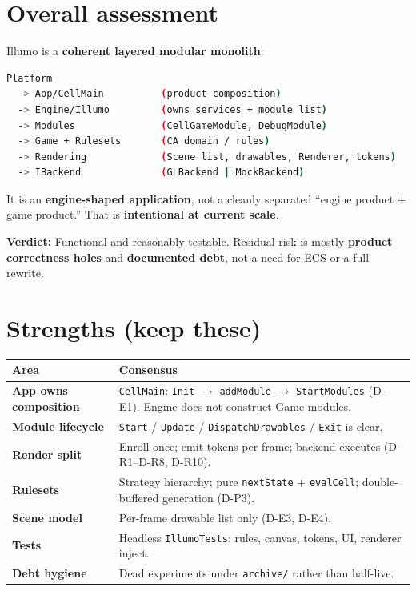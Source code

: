 \documentclass[10pt,a4paper]{article}
\begin{document}
\section{Overall assessment}
Illumo is a \textbf{coherent layered modular monolith}:

\begin{lstlisting}[language=bash]
Platform
  -> App/CellMain          (product composition)
  -> Engine/Illumo         (owns services + module list)
  -> Modules               (CellGameModule, DebugModule)
  -> Game + Rulesets       (CA domain / rules)
  -> Rendering             (Scene list, drawables, Renderer, tokens)
  -> IBackend              (GLBackend | MockBackend)
\end{lstlisting}

It is an \textbf{engine-shaped application}, not a cleanly separated ``engine product + game product.'' That is \textbf{intentional at current scale}.

\noindent \textbf{Verdict:} Functional and reasonably testable. Residual risk is mostly \textbf{product correctness holes} and \textbf{documented debt}, not a need for ECS or a full rewrite.

\section{Strengths (keep these)}
\begin{table}[h!]
\centering
\small
\begin{tabularx}{\textwidth}{l X}
\toprule
\textbf{Area} & \textbf{Consensus} \\
\midrule
\textbf{App owns composition} & \texttt{CellMain}: \texttt{Init} $\rightarrow$ \texttt{addModule} $\rightarrow$ \texttt{StartModules} (D-E1). Engine does not construct Game modules. \\
\textbf{Module lifecycle} & \texttt{Start} / \texttt{Update} / \texttt{DispatchDrawables} / \texttt{Exit} is clear. \\
\textbf{Render split} & Enroll once; emit tokens per frame; backend executes (D-R1--D-R8, D-R10). \\
\textbf{Rulesets} & Strategy hierarchy; pure \texttt{nextState} + \texttt{evalCell}; double-buffered generation (D-P3). \\
\textbf{Scene model} & Per-frame drawable list only (D-E3, D-E4). \\
\textbf{Tests} & Headless \texttt{IllumoTests}: rules, canvas, tokens, UI, renderer inject. \\
\textbf{Debt hygiene} & Dead experiments under \texttt{archive/} rather than half-live. \\
\bottomrule
\end{tabularx}
\end{table}
\end{document}
